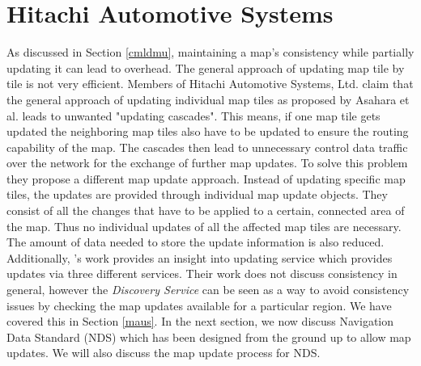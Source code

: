 \section{Hitachi Automotive Systems}
As discussed in Section \ref{cmldmu}, maintaining a map's consistency while partially updating it can lead to overhead. The general approach of updating map tile by tile is not very efficient. Members of Hitachi Automotive Systems, Ltd. \cite{hitachi} claim that the general approach of updating individual map tiles as proposed by Asahara et al. leads to unwanted "updating cascades". This means, if one map tile gets updated the neighboring map tiles also have to be updated to ensure the routing capability of the map. The cascades then lead to unnecessary control data traffic over the network for the exchange of further map updates. To solve this problem they propose a different map update approach. Instead of updating specific map tiles, the updates are provided through individual map update objects. They consist of all the changes that have to be applied to a certain, connected area of the map. Thus no individual updates of all the affected map tiles are necessary. The amount of data needed to store the update information is also reduced. \\

Additionally, \citet{min2011system}'s work provides an insight into updating service which provides updates via three different services. Their work does not discuss consistency in general, however the \textit{Discovery Service} can be seen as a way to avoid consistency issues by checking the map updates available for a particular region. We have covered this in Section \ref{maus}. In the next section, we now discuss Navigation Data Standard (NDS) which has been designed from the ground up to allow map updates. We will also discuss the map update process for NDS.



